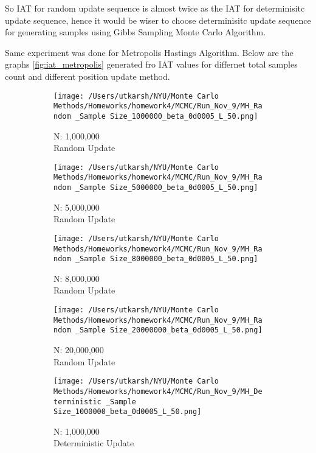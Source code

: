 \documentclass[11pt]{article}
\begin{document}
\par
\noindent So IAT for random update sequence is almost twice as the IAT for determinisitc update sequence, hence it would 
be wiser to choose determinisitc update sequence for generating samples using Gibbs Sampling Monte Carlo Algorithm.\\
\par
\noindent Same experiment was done for Metropolis Hastings Algorithm. Below are the graphs \ref{fig:iat_metropolis} generated fro IAT values for 
differnet total samples count and different position update method.
\begin{figure}[H]
	\centering
	\begin{subfigure}{.22\textwidth}
		\texttt{[image: /Users/utkarsh/NYU/Monte Carlo Methods/Homeworks/homework4/MCMC/Run\_Nov\_9/MH\_Random \_Sample Size\_1000000\_beta\_0d0005\_L\_50.png]}
		\caption{N: 1,000,000\\Random Update}
	\end{subfigure}
	\begin{subfigure}{.22\textwidth}
		\texttt{[image: /Users/utkarsh/NYU/Monte Carlo Methods/Homeworks/homework4/MCMC/Run\_Nov\_9/MH\_Random \_Sample Size\_5000000\_beta\_0d0005\_L\_50.png]}
		\caption{N: 5,000,000\\Random Update}
	\end{subfigure}
	\begin{subfigure}{.22\textwidth}
		\texttt{[image: /Users/utkarsh/NYU/Monte Carlo Methods/Homeworks/homework4/MCMC/Run\_Nov\_9/MH\_Random \_Sample Size\_8000000\_beta\_0d0005\_L\_50.png]}
		\caption{N: 8,000,000\\Random Update}
	\end{subfigure}
	\begin{subfigure}{.22\textwidth}
		\texttt{[image: /Users/utkarsh/NYU/Monte Carlo Methods/Homeworks/homework4/MCMC/Run\_Nov\_9/MH\_Random \_Sample Size\_20000000\_beta\_0d0005\_L\_50.png]}
		\caption{N: 20,000,000\\Random Update}
	\end{subfigure}
	\begin{subfigure}{.22\textwidth}
		\texttt{[image: /Users/utkarsh/NYU/Monte Carlo Methods/Homeworks/homework4/MCMC/Run\_Nov\_9/MH\_Deterministic \_Sample Size\_1000000\_beta\_0d0005\_L\_50.png]}
		\caption{N: 1,000,000\\Deterministic Update}
	\end{subfigure}
	\begin{subfigure}{.22\textwidth}

\end{subfigure}
\end{figure}
\end{document}
